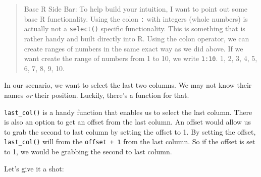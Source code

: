 \documentclass[
]{book}
\begin{document}
\begin{quote}
Base R Side Bar: To help build your intuition, I want to point out some base R functionality. Using the colon \texttt{:} with integers (whole numbers) is actually not a \texttt{select()} specific functionality. This is something that is rather handy and built directly into R. Using the colon operator, we can create ranges of numbers in the same exact way as we did above. If we want create the range of numbers from 1 to 10, we write \texttt{1:10}. 1, 2, 3, 4, 5, 6, 7, 8, 9, 10.
\end{quote}

In our scenario, we want to select the last two columns. We may not know their names \emph{or} their position. Luckily, there's a function for that.

\texttt{last\_col()} is a handy function that enables us to select the last column. There is also an option to get an offset from the last column. An offset would allow us to grab the second to last column by setting the offset to 1. By setting the offset, \texttt{last\_col()} will from the \texttt{offset\ +\ 1} from the last column. So if the offset is set to 1, we would be grabbing the second to last column.

Let's give it a shot:
\end{document}
